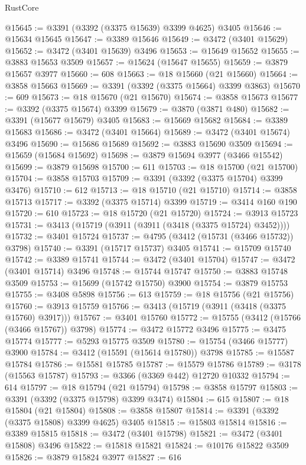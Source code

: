 \begin{lexlean}{RustCore}
\begin{coremodule}
@15645 := @3391 (@3392 (@3375 @15639) @3399 @4625) @3405
@15646 := @15634 @15645
@15647 := @3389 @15646
@15649 := @3472 (@3401 @15629)
@15652 := @3472 (@3401 @15639) @3496
@15653 := @15649 @15652
@15655 := @3883 @15653 @3509
@15657 := @15624 (@15647 @15655)
@15659 := @3879 @15657 @3977
@15660 := 608
@15663 := @18 @15660 (@21 @15660)
@15664 := @3858 @15663
@15669 := @3391 (@3392 (@3375 @15664) @3399 @3863)
@15670 := 609
@15673 := @18 @15670 (@21 @15670)
@15674 := @3858 @15673
@15677 := @3392 (@3375 @15674) @3399
@15679 := @3870 (@3871 @480)
@15682 := @3391 (@15677 @15679) @3405
@15683 := @15669 @15682
@15684 := @3389 @15683
@15686 := @3472 (@3401 @15664)
@15689 := @3472 (@3401 @15674) @3496
@15690 := @15686 @15689
@15692 := @3883 @15690 @3509
@15694 := @15659 (@15684 @15692)
@15698 := @3879 @15694 @3977 (@3466 @15542)
@15699 := @3879 @15698
@15700 := 611
@15703 := @18 @15700 (@21 @15700)
@15704 := @3858 @15703
@15709 := @3391 (@3392 (@3375 @15704) @3399 @3476)
@15710 := 612
@15713 := @18 @15710 (@21 @15710)
@15714 := @3858 @15713
@15717 := @3392 (@3375 @15714) @3399
@15719 := @3414 @160 @190
@15720 := 610
@15723 := @18 @15720 (@21 @15720)
@15724 := @3913 @15723
@15731 := @3413 (@15719 (@3911 (@3911 (@3418 (@3375 @15724) @3452))))
@15732 := @3401 @15724
@15737 := @4795 (@3412 (@15731 (@3466 @15732)) @3798)
@15740 := @3391 (@15717 @15737) @3405
@15741 := @15709 @15740
@15742 := @3389 @15741
@15744 := @3472 (@3401 @15704)
@15747 := @3472 (@3401 @15714) @3496
@15748 := @15744 @15747
@15750 := @3883 @15748 @3509
@15753 := @15699 (@15742 @15750) @3900
@15754 := @3879 @15753
@15755 := @3408 @5898
@15756 := 613
@15759 := @18 @15756 (@21 @15756)
@15760 := @3913 @15759
@15766 := @3413 (@15719 (@3911 (@3418 (@3375 @15760) @3917)))
@15767 := @3401 @15760
@15772 := @15755 (@3412 (@15766 (@3466 @15767)) @3798)
@15774 := @3472 @15772 @3496
@15775 := @3475 @15774
@15777 := @5293 @15775 @3509
@15780 := @15754 (@3466 @15777) @3900
@15784 := @3412 (@15591 (@15614 @15780)) @3798
@15785 := @15587 @15784
@15786 := @15581 @15785
@15787 := @15579 @15786
@15789 := @3178 (@15563 @15787)
@15793 := @3366 (@3369 @442) @12720 @10332
@15794 := 614
@15797 := @18 @15794 (@21 @15794)
@15798 := @3858 @15797
@15803 := @3391 (@3392 (@3375 @15798) @3399 @3474)
@15804 := 615
@15807 := @18 @15804 (@21 @15804)
@15808 := @3858 @15807
@15814 := @3391 (@3392 (@3375 @15808) @3399 @4625) @3405
@15815 := @15803 @15814
@15816 := @3389 @15815
@15818 := @3472 (@3401 @15798)
@15821 := @3472 (@3401 @15808) @3496
@15822 := @15818 @15821
@15824 := @10176 @15822 @3509
@15826 := @3879 @15824 @3977
@15827 := 616

\end{coremodule}
\end{lexlean}
